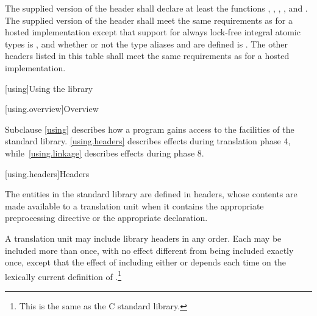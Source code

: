 \pnum
The supplied version of the header 
shall declare at least the functions
%
,
%
,
%
,
%
,
and
%
.
%
The supplied version of the header 
shall meet the same requirements as for a hosted implementation
except that support for
always lock-free integral atomic types
is , and
whether or not the type aliases  and
 are defined
is .
The other headers listed in this table
shall meet the same requirements as for a hosted implementation.
%

[using]{Using the library}

[using.overview]{Overview}

\pnum
Subclause \ref{using} describes how a \Cpp{} program gains access to the facilities of the
\Cpp{} standard library. \ref{using.headers} describes effects during translation
phase 4, while~\ref{using.linkage} describes effects during phase
8.

[using.headers]{Headers}

\pnum
The entities in the \Cpp{} standard library are defined in headers,
whose contents are made available to a translation unit when it contains the appropriate
%
%
preprocessing directive
or the appropriate
%
 declaration.

\pnum
A translation unit may include library headers in any order.
%
Each may be included more than once, with no effect different from
being included exactly once, except that the effect of including either
 or 
depends each time on the lexically current definition of
%
%
.\footnote{This is the same as the C standard library.}

